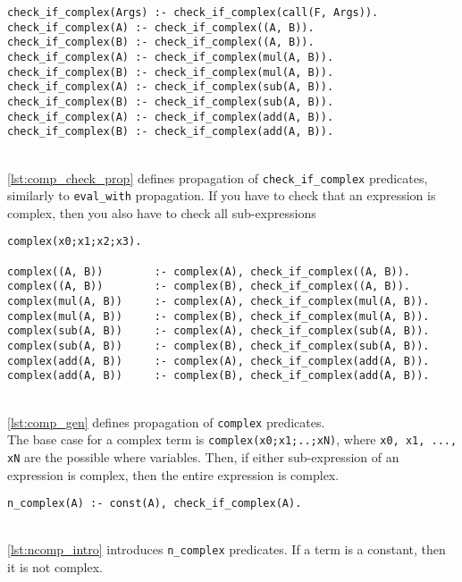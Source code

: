 \begin{lstlisting}[caption={Checking propagation}, label={lst:comp_check_prop}, firstnumber=151]
check_if_complex(Args) :- check_if_complex(call(F, Args)).
check_if_complex(A) :- check_if_complex((A, B)).
check_if_complex(B) :- check_if_complex((A, B)).
check_if_complex(A) :- check_if_complex(mul(A, B)).
check_if_complex(B) :- check_if_complex(mul(A, B)).
check_if_complex(A) :- check_if_complex(sub(A, B)).
check_if_complex(B) :- check_if_complex(sub(A, B)).
check_if_complex(A) :- check_if_complex(add(A, B)).
check_if_complex(B) :- check_if_complex(add(A, B)).
\end{lstlisting}
\mbox{} \\
\ref{lst:comp_check_prop} defines propagation of \lstinline!check_if_complex! predicates, similarly to \lstinline!eval_with! propagation. If you have to check that an expression is complex, then you also have to check all sub-expressions\\

\begin{lstlisting}[caption={Complex generation}, label={lst:comp_gen}, firstnumber=161]
complex(x0;x1;x2;x3).

complex((A, B))        :- complex(A), check_if_complex((A, B)).
complex((A, B))        :- complex(B), check_if_complex((A, B)).
complex(mul(A, B))     :- complex(A), check_if_complex(mul(A, B)).
complex(mul(A, B))     :- complex(B), check_if_complex(mul(A, B)).
complex(sub(A, B))     :- complex(A), check_if_complex(sub(A, B)).
complex(sub(A, B))     :- complex(B), check_if_complex(sub(A, B)).
complex(add(A, B))     :- complex(A), check_if_complex(add(A, B)).
complex(add(A, B))     :- complex(B), check_if_complex(add(A, B)).
\end{lstlisting}
\mbox{} \\
\ref{lst:comp_gen} defines propagation of \lstinline!complex! predicates. \\
The base case for a complex term is \lstinline!complex(x0;x1;..;xN)!, where \lstinline!x0, x1, ..., xN! are the possible where variables. Then, if either sub-expression of an expression is complex, then the entire expression is complex. \\

\begin{lstlisting}[caption={Non complex introduction}, label={lst:ncomp_intro}, firstnumber=172]
n_complex(A) :- const(A), check_if_complex(A).
\end{lstlisting}
\mbox{} \\
\ref{lst:ncomp_intro} introduces \lstinline!n_complex! predicates. If a term is a constant, then it is not complex. \\

